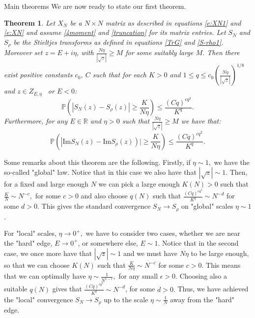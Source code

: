 \documentclass[11pt, a4paper, oneside]{book}
\numberwithin{equation}{chapter}
\newcommand{\beq}{\begin{equation}}
\newcommand{\eeq}{\end{equation}}
\newtheorem{thm}{Theorem}[section]
\begin{document}
\begin{section}{Main theorems}
We are now ready to state our first theorem.
\begin{thm}
\label{t:sti}
Let $X_N$ be a $N\times N $ matrix as described in equations \eqref{e:XN1} and \eqref{e:XN} and assume \eqref{4moment} and \eqref{truncation} for its matrix entries. Let $S_N$ and $S_{\rho}$ be the Stieltjes transforms as defined in equations \eqref{TrG} and \eqref{S-rho1}. Moreover set $z = E + i \eta$, with $\frac{N\eta}{|\sqrt{z}|} \geq M$  for some suitably large $M$. Then there exist positive constants $c_0$, $C$ such that for each $K>0$ and $ 1\leq q \leq c_0\left ( \frac{N\eta}{|\sqrt{z}|} \right )^{1/8} $ and $z \in Z_{E,\eta}$ \ or $E < 0$:
%
\beq
\mathbb{P} \left( \left | S_N(z)-S_{\rho}(z) \right | \geq  \frac{K}{N\eta} \right) \leq \frac{(Cq)^{cq^2}}{K^q}.
\eeq
%
Furthermore, for any $E \in \mathbb{R}$ and $\eta>0$ such that $\frac{N\eta}{|\sqrt{z}|} \geq M$ we have that:
%
\beq
 \mathbb{P} \left( \left | \mathrm{Im} S_N(z) - \mathrm{Im} S_{\rho} (z) \right) | \geq \frac{K}{N\eta} \right) \leq \frac{(Cq)^{cq^2}}{K^q}.
\eeq
%
\end{thm}
%
Some remarks about this theorem are the following. Firstly, if $\eta \sim 1,$ we have the so-called "global" law. Notice that in this case we also have that $|\sqrt{z}| \sim 1.$ Then, for a fixed and large enough $N$ we can pick a large enough $K(N) > 0$ such that $\frac{K}{N} \sim N^{-c},$ for some $c>0$ and also choose $q(N)$ such that $\frac{(Cq)^{cq^2}}{K^q} \sim N^{-d}$ for some $d>0.$ This gives the standard convergence $S_N \to S_{\rho}$ on "global" scales $\eta \sim 1$.

For "local" scales, $\eta \to 0^+ ,$ we have to consider two cases, whether we are near the "hard" edge, $E \to 0^+$, or somewhere else, $E \sim 1.$ Notice that in the second case, we once more have that $|\sqrt{z}| \sim 1$ and we must have $N\eta$ to be large enough, so that we can choose $K(N)$ such that $\frac{K}{N\eta} \sim N^{-c}$ for some $c>0.$ This means that we can optimally have $\eta \sim \frac{1}{N^{1-\epsilon}}, $ for any small $\epsilon > 0.$ Choosing also a suitable $q(N)$ gives that $\frac{(Cq)^{cq^2}}{K^q} \sim N^{-d}$, for some $d>0.$ Thus, we have achieved the "local" convergence $S_N \to S_{\rho}$ up to the scale $\eta \sim \frac{1}{N}$ away from the "hard" edge.


\end{section}
\end{document}

